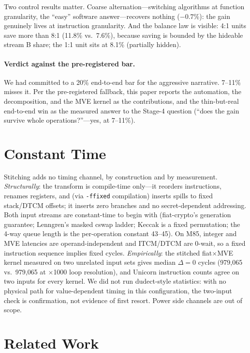\documentclass[11pt,a4paper]{article}
\begin{document}
Two control results matter. Coarse alternation---switching algorithms at
function granularity, the ``easy'' software answer---recovers nothing
($-0.7\%$): the gain genuinely lives at instruction granularity. And the
balance law is visible: 4:1 units save more than 8:1 (11.8\% vs.\ 7.6\%),
because saving is bounded by the hideable stream B share; the 1:1 unit sits at
8.1\% (partially hidden).

\paragraph{Verdict against the pre-registered bar.} We had committed to a 20\%
end-to-end bar for the aggressive narrative. 7--11\% misses it. Per the
pre-registered fallback, this paper reports the automation, the decomposition,
and the MVE kernel as the contributions, and the thin-but-real end-to-end win
as the measured answer to the Stage-4 question (``does the gain survive whole
operations?''---yes, at 7--11\%).

\section{Constant Time}\label{sec:ct}

Stitching adds no timing channel, by construction and by measurement.
\emph{Structurally}: the transform is compile-time only---it reorders
instructions, renames registers, and (via \texttt{-ffixed} compilation) inserts
spills to fixed stack/DTCM offsets; it inserts zero branches and no
secret-dependent addressing. Both input streams are constant-time to begin with
(fiat-crypto's generation guarantee; Lenngren's masked cswap ladder; Keccak is
a fixed permutation; the 4-way queue length is the per-operation constant
43--45). On M85, integer and MVE latencies are operand-independent and
ITCM/DTCM are 0-wait, so a fixed instruction sequence implies fixed cycles.
\emph{Empirically}: the stitched fiat$\times$MVE kernel measured on two
unrelated input sets gives median $\Delta = 0$ cycles (979,065 vs.\ 979,065 at
$\times$1000 loop resolution), and Unicorn instruction counts agree on two
inputs for every kernel. We did not run dudect-style statistics: with no
physical path for value-dependent timing in this configuration, the two-input
check is confirmation, not evidence of first resort. Power side channels are
out of scope.

\section{Related Work}\label{sec:related}
\end{document}
